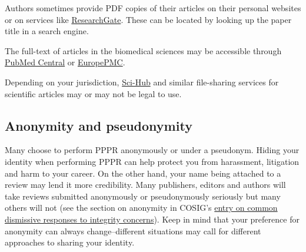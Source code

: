 \documentclass[letterpaper, 12pt]{article}
\begin{document}
Authors sometimes provide PDF copies of their articles on their personal websites or on services like \href{https://www.researchgate.net/}{ResearchGate}. These can be located by looking up the paper title in a search engine.

The full-text of articles in the biomedical sciences may be accessible through \href{https://pmc.ncbi.nlm.nih.gov/}{PubMed Central} or \href{https://europepmc.org/}{EuropePMC}.

Depending on your jurisdiction, \href{https://en.wikipedia.org/wiki/Sci-Hub}{Sci-Hub} and similar file-sharing services for scientific articles may or may not be legal to use.

\subsection*{Anonymity and pseudonymity}

Many choose to perform PPPR anonymously or under a pseudonym. Hiding your identity when performing PPPR can help protect you from harassment, litigation and harm to your career. On the other hand, your name being attached to a review may lend it more credibility. Many publishers, editors and authors will take reviews submitted anonymously or pseudonymously seriously but many others will not (see the section on anonymity in COSIG's \href{https://osf.io/7w5ys}{entry on common dismissive responses to integrity concerns}). Keep in mind that your preference for anonymity can always change--different situations may call for different approaches to sharing your identity.
\end{document}

